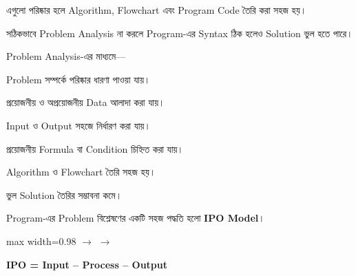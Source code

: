 এগুলো পরিষ্কার হলে Algorithm, Flowchart এবং Program Code
তৈরি করা সহজ হয়।


সঠিকভাবে Problem Analysis না করলে Program-এর Syntax ঠিক হলেও
Solution ভুল হতে পারে।

Problem Analysis-এর মাধ্যমে—

\begin{compacttwocolpoints}

\item Problem সম্পর্কে পরিষ্কার ধারণা পাওয়া যায়।

\item প্রয়োজনীয় ও অপ্রয়োজনীয় Data আলাদা করা যায়।

\item Input ও Output সহজে নির্ধারণ করা যায়।

\item প্রয়োজনীয় Formula বা Condition চিহ্নিত করা যায়।

\item Algorithm ও Flowchart তৈরি সহজ হয়।

\item ভুল Solution তৈরির সম্ভাবনা কমে।

\end{compacttwocolpoints}


Program-এর Problem বিশ্লেষণের একটি সহজ পদ্ধতি হলো
\textbf{IPO Model}।

\begin{center}
\begin{adjustbox}{max width=0.98\linewidth}
\quad
\(\longrightarrow\)
\quad
{}
\quad
\(\longrightarrow\)
\quad
{}
\end{adjustbox}
\end{center}

\begin{center}

\textbf{
IPO = Input -- Process -- Output
}

\end{center}

